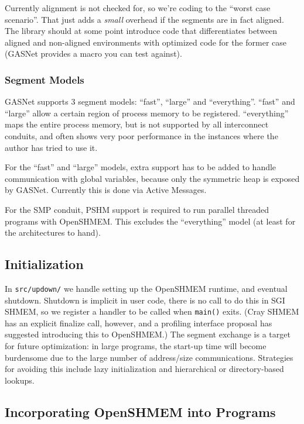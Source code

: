 \documentclass[english]{article}
\newcommand{\openshmem} {\mbox{OpenSHMEM}\xspace}
\begin{document}
Currently alignment is not checked for, so we're coding to the
``worst case scenario''. That just adds a \emph{small} overhead if
the segments are in fact aligned. The library should at some point
introduce code that differentiates between aligned and non-aligned
environments with optimized code for the former case (GASNet provides
a macro you can test against).

\subsubsection{Segment Models}

GASNet supports 3 segment models: ``fast'', ``large'' and
``everything''.  ``fast'' and ``large'' allow a certain region of
process memory to be registered.  ``everything'' maps the entire
process memory, but is not supported by all interconnect conduits, and
often shows very poor performance in the instances where the author
has tried to use it.

For the ``fast'' and ``large'' models, extra support has to be added
to handle communication with global variables, because only the
symmetric heap is exposed by GASNet. Currently this is done via Active
Messages.

For the SMP conduit, PSHM support is required to run parallel threaded
programs with \openshmem. This excludes the ``everything'' model (at
least for the architectures to hand).

\subsection{Initialization}

In \texttt{src/updown/} we handle setting up the \openshmem runtime,
and eventual shutdown. Shutdown is implicit in user code, there is no
call to do this in SGI SHMEM, so we register a handler to be called
when \texttt{main()} exits. (Cray SHMEM has an explicit finalize call,
however, and a profiling interface proposal has suggested introducing
this to \openshmem.) The segment exchange is a target for future
optimization: in large programs, the start-up time will become
burdensome due to the large number of address/size
communications. Strategies for avoiding this include lazy
initialization and hierarchical or directory-based lookups.

\subsection{Incorporating \openshmem into Programs}
\end{document}
